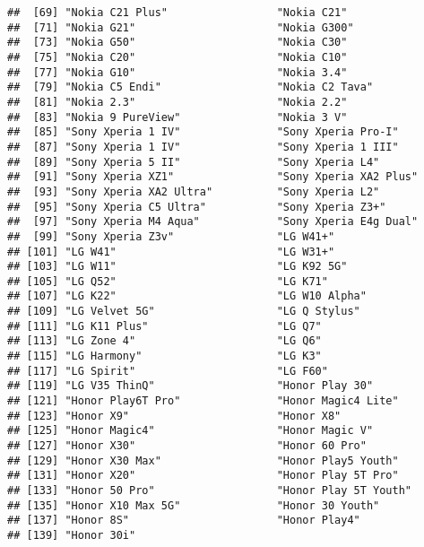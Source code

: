 \documentclass[
]{article}
\begin{document}
\begin{verbatim}
##  [69] "Nokia C21 Plus"                 "Nokia C21"                     
##  [71] "Nokia G21"                      "Nokia G300"                    
##  [73] "Nokia G50"                      "Nokia C30"                     
##  [75] "Nokia C20"                      "Nokia C10"                     
##  [77] "Nokia G10"                      "Nokia 3.4"                     
##  [79] "Nokia C5 Endi"                  "Nokia C2 Tava"                 
##  [81] "Nokia 2.3"                      "Nokia 2.2"                     
##  [83] "Nokia 9 PureView"               "Nokia 3 V"                     
##  [85] "Sony Xperia 1 IV"               "Sony Xperia Pro-I"             
##  [87] "Sony Xperia 1 IV"               "Sony Xperia 1 III"             
##  [89] "Sony Xperia 5 II"               "Sony Xperia L4"                
##  [91] "Sony Xperia XZ1"                "Sony Xperia XA2 Plus"          
##  [93] "Sony Xperia XA2 Ultra"          "Sony Xperia L2"                
##  [95] "Sony Xperia C5 Ultra"           "Sony Xperia Z3+"               
##  [97] "Sony Xperia M4 Aqua"            "Sony Xperia E4g Dual"          
##  [99] "Sony Xperia Z3v"                "LG W41+"                       
## [101] "LG W41"                         "LG W31+"                       
## [103] "LG W11"                         "LG K92 5G"                     
## [105] "LG Q52"                         "LG K71"                        
## [107] "LG K22"                         "LG W10 Alpha"                  
## [109] "LG Velvet 5G"                   "LG Q Stylus"                   
## [111] "LG K11 Plus"                    "LG Q7"                         
## [113] "LG Zone 4"                      "LG Q6"                         
## [115] "LG Harmony"                     "LG K3"                         
## [117] "LG Spirit"                      "LG F60"                        
## [119] "LG V35 ThinQ"                   "Honor Play 30"                 
## [121] "Honor Play6T Pro"               "Honor Magic4 Lite"             
## [123] "Honor X9"                       "Honor X8"                      
## [125] "Honor Magic4"                   "Honor Magic V"                 
## [127] "Honor X30"                      "Honor 60 Pro"                  
## [129] "Honor X30 Max"                  "Honor Play5 Youth"             
## [131] "Honor X20"                      "Honor Play 5T Pro"             
## [133] "Honor 50 Pro"                   "Honor Play 5T Youth"           
## [135] "Honor X10 Max 5G"               "Honor 30 Youth"                
## [137] "Honor 8S"                       "Honor Play4"                   
## [139] "Honor 30i"
\end{verbatim}
\end{document}
